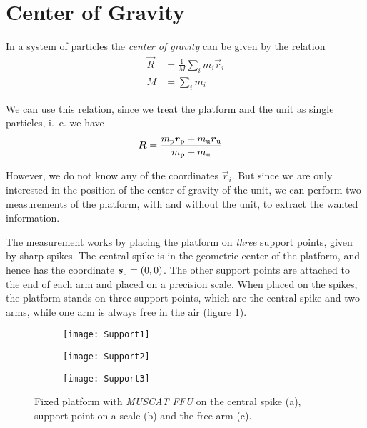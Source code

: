 \documentclass[journal]{IEEEtran}
\begin{document}
\section{Center of Gravity}

In a system of particles the \emph{center of gravity} can be given by the relation \cite{book:goldstein}
\begin{align}
	\vec{R} & = \frac{1}{M} \sum_{i} m_i \vec{r}_i \\
	\label{eq:SystemCoG}
	M & = \sum_{i} m_i
\end{align}

We can use this relation, since we treat the platform and the unit as single particles, i.~e. we have
\begin{align}
	\vec{R} & = \frac{m_{\textup{p}} \vec{r}_{\textup{p}} + m_{\textup{u}} \vec{r}_{\textup{u}}}{m_{\textup{p}} + m_{\textup{u}}} \label{eq:CogFull}
\end{align}

However, we do not know any of the coordinates $\vec{r}_i$. 
But since we are only interested in the position of the center of gravity of the unit, we can perform two measurements of the platform, with and without the unit, to extract the wanted information.

The measurement works by placing the platform on \emph{three} support points, given by sharp spikes.
The central spike is in the geometric center of the platform, and hence has the coordinate $\vec{s}_{\textup{c}} = (0, 0)$.
The other support points are attached to the end of each arm and placed on a precision scale. When placed on the spikes, the platform stands on three support points, which are the central spike and two arms, while one arm is always free in the air (figure \ref{fig:Support}).

\begin{figure}[b]
	\centering

	\begin{subfigure}{0.32\linewidth}
		\texttt{[image: Support1]}
		\subcaption{}
	\end{subfigure}
	\begin{subfigure}{0.32\linewidth}
		\texttt{[image: Support2]}
		\subcaption{}
	\end{subfigure}
	\begin{subfigure}{0.32\linewidth}
		\texttt{[image: Support3]}
		\subcaption{}
	\end{subfigure}

	\caption{Fixed platform with \emph{MUSCAT FFU} on the central spike (a), support point on a scale (b) and the free arm (c).}
	\label{fig:Support}
\end{figure}
\end{document}
